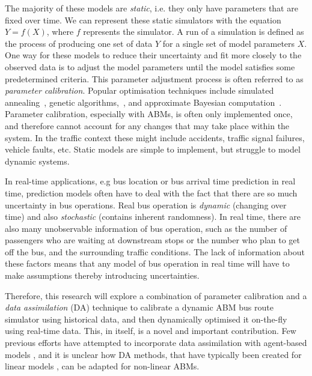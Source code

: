 The majority of these models are \textit{static}, i.e. they only have parameters that are fixed over time. We can represent these static simulators 
with the equation $Y = f(X)$, where $f$ represents the simulator. A run of a simulation is defined
as the process of producing one set of data $Y$ for a single set of
model parameters $X$. One way for these
models to reduce their uncertainty and fit more closely to the observed data is to
adjust the model parameters until the model satisfies some predetermined
criteria. This parameter adjustment process is often referred to as
\textit{parameter calibration}. Popular optimisation techniques include simulated annealing~\citep{pennisi_optimal_2008}, genetic
algorithms,~\citep{heppenstall_genetic_2007, malleson_optimising_2014},
and approximate Bayesian computation~\citep{grazzini_bayesian_2017}.
Parameter calibration, especially with ABMs, is often only
implemented once, and therefore cannot account for any changes that may take place within
the system. In the traffic context these might include accidents, traffic signal failures, vehicle faults, etc. Static models are simple to implement, but struggle to model dynamic systems. 



In real-time applications, e.g bus location or bus arrival time prediction in real time, prediction models often have to deal with the fact that there are so much uncertainty in bus operations. Real bus operation is \textit{dynamic} (changing over time) and also \textit{stochastic} (contains inherent randomness). In real time, there are also many unobservable information of bus operation, such as the number of passengers who are waiting at
downstream stops or the number who plan to get off the bus, and the
surrounding traffic conditions.  The lack of information about these factors means that any model of bus
operation in real time will have to make assumptions thereby introducing uncertainties. 

Therefore, this research will explore a combination of parameter calibration and a \textit{data
assimilation} (DA) technique to calibrate a dynamic ABM bus route simulator using historical data, and then dynamically optimised it on-the-fly using real-time data. This, in itself, is a novel and important
contribution. Few previous efforts have attempted to incorporate data
assimilation with agent-based models \citep[for example
see][]{ward_dynamic_2016, wang_data_2015}, and it is unclear how DA
methods, that have typically been created for linear models
\citep{harvey1990forecasting}, can be adapted for non-linear ABMs. 

